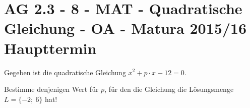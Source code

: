 \section{AG 2.3 - 8 - MAT - Quadratische Gleichung - OA - Matura 2015/16 Haupttermin}

\begin{beispiel}[AG 2.3]{1} %
Gegeben ist die quadratische Gleichung $x^2+p\cdot x - 12  =0$. \leer

Bestimme denjenigen Wert für $p$, für den die Gleichung die Lösungsmenge \mbox{$L =\{-2;~6\}$} hat!


\end{beispiel}